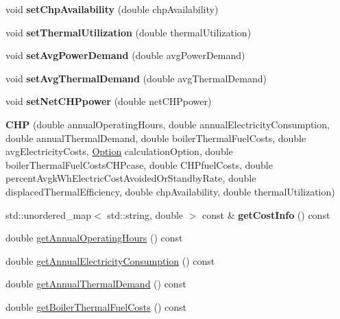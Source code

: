 \begin{DoxyCompactItemize}
void {\bfseries set\+Chp\+Availability} (double chp\+Availability)
\item 
\mbox{\label{class_c_h_p_a8917dfa8b8a68244d0ffe3fd3ca1d13f}} 
void {\bfseries set\+Thermal\+Utilization} (double thermal\+Utilization)
\item 
\mbox{\label{class_c_h_p_a4f3183df776744f6871fb59b07553d2c}} 
void {\bfseries set\+Avg\+Power\+Demand} (double avg\+Power\+Demand)
\item 
\mbox{\label{class_c_h_p_a0036fd3fc3154adc0fdba0ede8277bee}} 
void {\bfseries set\+Avg\+Thermal\+Demand} (double avg\+Thermal\+Demand)
\item 
\mbox{\label{class_c_h_p_a625efb308ccd22c8bdf75f082ff7bae2}} 
void {\bfseries set\+Net\+C\+H\+Ppower} (double net\+C\+H\+Ppower)
\item 
\mbox{\label{class_c_h_p_aea45a2afd5189214fbf720e53d587640}} 
{\bfseries C\+HP} (double annual\+Operating\+Hours, double annual\+Electricity\+Consumption, double annual\+Thermal\+Demand, double boiler\+Thermal\+Fuel\+Costs, double avg\+Electricity\+Costs, \hyperlink{class_c_h_p_ac82f530412021ace928a7e95c1295d06}{Option} calculation\+Option, double boiler\+Thermal\+Fuel\+Costs\+C\+H\+Pcase, double C\+H\+Pfuel\+Costs, double percent\+Avgk\+Wh\+Electric\+Cost\+Avoided\+Or\+Standby\+Rate, double displaced\+Thermal\+Efficiency, double chp\+Availability, double thermal\+Utilization)
\item 
\mbox{\label{class_c_h_p_a9b448b253454087f9e98124aa716715f}} 
std\+::unordered\+\_\+map$<$ std\+::string, double $>$ const  \& {\bfseries get\+Cost\+Info} () const
\item 
double \hyperlink{class_c_h_p_aeeb03f1f40db034babf883a1e00ed2a3}{get\+Annual\+Operating\+Hours} () const
\item 
double \hyperlink{class_c_h_p_a37d544d03c45668a9dc5d502cdcb6137}{get\+Annual\+Electricity\+Consumption} () const
\item 
double \hyperlink{class_c_h_p_a849a576483b92b131ebfc0615e1e0bdb}{get\+Annual\+Thermal\+Demand} () const
\item 
double \hyperlink{class_c_h_p_a9f6c6638b1be7c2df8ba4b406c3b2b94}{get\+Boiler\+Thermal\+Fuel\+Costs} () const

\end{DoxyCompactItemize}
